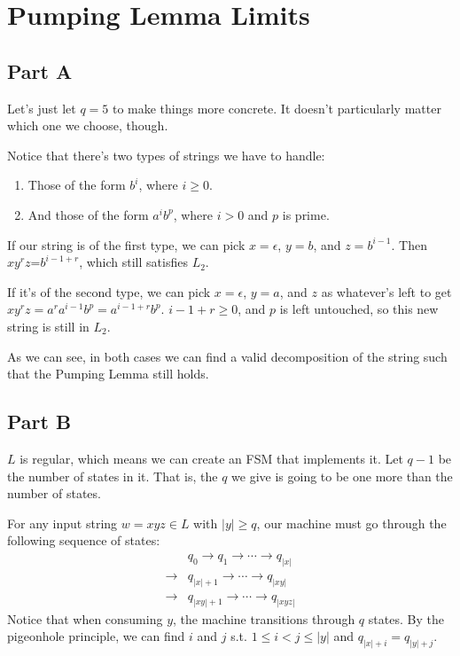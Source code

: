 \documentclass[12pt]{article}
\begin{document}
\section{Pumping Lemma Limits}

\subsection{Part A}

Let's just let $q=5$ to make things more concrete.
It doesn't particularly matter which one we choose, though.

Notice that there's two types of strings we have to handle:
\begin{enumerate}[nolistsep]
    \item Those of the form $b^i$, where $i \ge 0$.
    \item And those of the form $a^i b^p$, where $i>0$ and $p$ is prime.
\end{enumerate}

If our string is of the first type, we can pick $x=\epsilon$, $y=b$, and $z=b^{i-1}$.
Then $xy^r z$=$b^{i-1+r}$, which still satisfies $L_2$.

If it's of the second type, we can pick $x=\epsilon$, $y=a$,
and $z$ as whatever's left to get $xy^r z=a^r a^{i-1} b^p=a^{i-1+r}b^p$.
$i-1+r \ge 0$, and $p$ is left untouched, so this new string is still in $L_2$.

As we can see, in both cases we can find a valid decomposition
of the string such that the Pumping Lemma still holds.

\subsection{Part B} \label{subsec:generalization}

$L$ is regular, which means we can create an FSM that implements it.
Let $q-1$ be the number of states in it.
That is, the $q$ we give is going to be one more than the number of states.

For any input string $w=xyz \in L$ with $|y| \ge q$, our machine must
go through the following sequence of states:
\begin{align*}
        & q_0 \to q_1 \to \cdots \to q_{|x|} \\
    \to{} & q_{|x|+1} \to \cdots \to q_{|xy|} \\
    \to{} & q_{|xy|+1} \to \cdots \to q_{|xyz|}
\end{align*}
Notice that when consuming $y$, the machine transitions through $q$ states.
By the pigeonhole principle, we can find $i$ and $j$ s.t. $1 \le i<j \le |y|$
and $q_{|x|+i}=q_{|y|+j}$.
\end{document}
